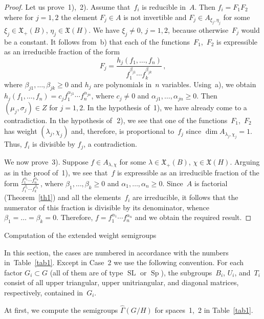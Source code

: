 \documentclass[12pt]{amsart}
\theoremstyle{definition}
\theoremstyle{remark}
\begin{document}
\begin{proof}
Let us prove~1),~2). Assume that~$f_i$ is reducible in~$A$. Then
$f_i=F_1F_2$ where for $j=1,2$ the element $F_j\in A$ is not
invertible and $F_j\in A_{\xi_j,\eta_j}$ for some
$\xi_j\in\mathfrak{X}_+(B)$, $\eta_j\in\mathfrak{X}(H)$. We have
$\xi_j\ne0$, $j=1,2$, because otherwise~$F_j$ would be a constant.
It follows from~b) that each of the functions~$F_1$,~$F_2$ is
expressible as an irreducible fraction of the form
$$
F_j=\frac {h_j(f_1,\dots,f_n)}{f_1^{\beta_{j1}}\cdots
f_k^{\beta_{jk}}}\,,
$$
where $\beta_{j1},\dots,\beta_{jk}{\geqslant}0$ and $h_j$ are polynomials
in~$n$ variables. Using~a), we obtain $h_j(f_1,\dots,f_n)= c_j
f_1^{\alpha_{j1}}\cdots f_n^{\alpha_{jn}}$, where $c_j\ne0$ and
$\alpha_{j1},\dots,\alpha_{jn}{\geqslant}0$. Then $(\mu_j,\sigma_j) \in Z$
for $j=1,2$. In the hypothesis of~1), we have already come to a
contradiction. In the hypothesis of\,~2), we see that one of the
functions~$F_1$,~$F_2$ has weight $(\lambda_j,\chi_j)$ and,
therefore, is proportional to~$f_j$ since $\dim
A_{\lambda_j,\chi_j}=1$. Thus, $f_i$ is divisible by $f_j$, a
contradiction.

We now prove~3). Suppose $f\in A_{\lambda,\chi}$ for some
$\lambda\in\mathfrak{X}_+(B)$, $\chi\in\mathfrak{X}(H)$. Arguing as
in the proof of~1), we see that~$f$ is expressible as an irreducible
fraction of the form $\frac{f_1^{\alpha_1}\cdots
f_n^{\alpha_n}}{f_1^{\beta_1}\cdots f_k^{\beta_k}}$\,, where
$\beta_1,\dots,\beta_k{\geqslant}0$ and $\alpha_1,\dots,\alpha_n{\geqslant}0$.
Since~$A$ is factorial (Theorem~\ref{th1}) and all the
elements~$f_i$ are irreducible, it follows that the numerator of
this fraction is divisible by its denominator, whence
$\beta_1=\dots=\beta_k=0$. Therefore, $f=f_1^{\alpha_1}\cdots
f_n^{\alpha_n}$ and we obtain the required result.
\end{proof}

{}{Computation of the extended weight semigroups}
\label{sec3}

In this section, the cases are numbered in accordance with the
numbers in~Table~\ref{tab1}. Except in Case~2 we use the following
convention. For each factor $G_i\subset G$ (all of them are of type
${\operatorname{SL}}$ or ${\operatorname{Sp}}$), the subgroups~$B_i$, $U_i$, and~$T_i$ consist of
all upper triangular, upper unitriangular, and diagonal matrices,
respectively, contained in~$G_i$.

{}{}
\label{ssec3.1} At first, we compute the semigroups
$\widehat\Gamma(G/H)$ for spaces~1,~2 in Table~\ref{tab1}.
\end{document}

